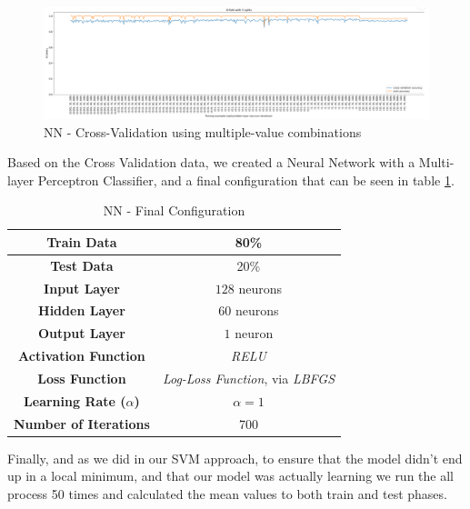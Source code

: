 \begin{figure}[htbp]
\centerline{\includegraphics[width=1\linewidth]{images/nn_cross_validation.png}}
\caption{NN - Cross-Validation using multiple-value combinations}
\label{fig:nn-cross-validation}
\end{figure}

Based on the Cross Validation data, we created a Neural Network with a Multi-layer Perceptron Classifier, and a final configuration that can be seen in table \ref{table:nn-final-configuration}.

\begin{table}[htbp]
\centering
\caption{NN - Final Configuration}
\begin{tabular}{ |c|c| } 
 \hline
 \textbf{Train Data} & 80\% \\ 
 \hline
 \textbf{Test Data} & 20\% \\ 
 \hline
 \textbf{Input Layer} & \(128\) neurons \\ 
 \hline
 \textbf{Hidden Layer} & \(60\) neurons \\ 
 \hline
 \textbf{Output Layer} & \(1\) neuron \\ 
 \hline
 \textbf{Activation Function} & \textit{RELU} \\ 
 \hline
 \textbf{Loss Function} & \textit{Log-Loss Function}, via \textit{LBFGS} \\ 
 \hline
 \textbf{Learning Rate (\(\alpha\))} & \(\alpha = 1\) \\ 
 \hline
 \textbf{Number of Iterations} & 700 \\ 
 \hline
\end{tabular}
\label{table:nn-final-configuration}
\end{table}

Finally, and as we did in our SVM approach, to ensure that the model didn't end up in a local minimum, and that our model was actually learning we run the all process 50 times and calculated the mean values to both train and test phases.